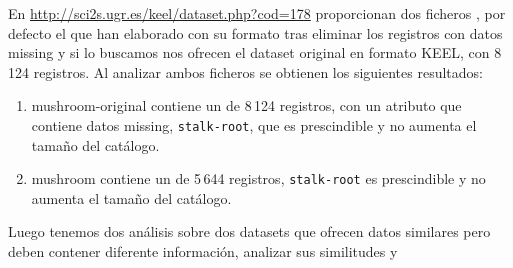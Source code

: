En \href{KEEL - Mushroom}{http://sci2s.ugr.es/keel/dataset.php?cod=178} proporcionan dos ficheros \mushroom, por defecto el que han elaborado con su formato tras eliminar los registros con datos missing y si lo buscamos nos ofrecen el dataset original en formato KEEL, con 8\,124 registros. Al analizar ambos ficheros se obtienen los siguientes resultados:
\begin{enumerate}
  \item mushroom-original contiene un \CC de 8\,124 registros, con un atributo que contiene datos missing, \texttt{stalk-root}, que es prescindible y no aumenta el tamaño del catálogo.
  \item mushroom contiene un \CC de 5\,644 registros, \texttt{stalk-root} es prescindible y no aumenta el tamaño del catálogo.
\end{enumerate}
Luego tenemos dos análisis sobre dos datasets que ofrecen datos similares pero deben contener diferente información, analizar sus similitudes y 